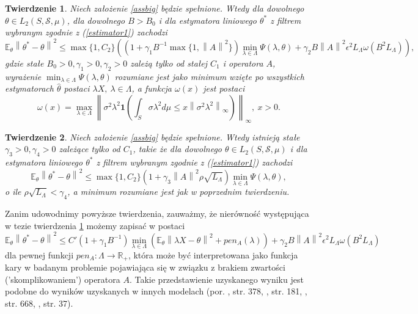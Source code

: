 \documentclass{mwart}
\newtheorem{tw}{Twierdzenie}
\newcommand{\norm}[1]{\left\lVert#1\right\rVert}
\begin{document}
\begin{tw}\label{glowny3}
Niech założenie \ref{assbig} będzie spełnione. Wtedy dla dowolnego $\theta\in L_2(S,\mathcal{S},\mu)$, dla dowolnego $B>B_0$ i dla estymatora liniowego $\theta^*$ z filtrem wybranym zgodnie z (\ref{estimator1}) zachodzi
\begin{displaymath}
\mathbb{E}_{\theta}\norm{\theta^*-\theta}^2\leq \max \{1,C_2\}\left((1+\gamma_1B^{-1}\max\{1,\norm{A}^2\})\min_{\lambda\in \Lambda}\Psi(\lambda,\theta)+\gamma_2B\norm{A}^2\epsilon^2L_{\Lambda}\omega(B^2L_{\Lambda})\right),
\end{displaymath}
gdzie stałe $B_0>0,\gamma_1>0,\gamma_2>0$ zależą tylko od stałej $C_1$ i operatora $A$, wyrażenie $\min_{\lambda\in \Lambda}\Psi(\lambda,\theta)$ rozumiane jest jako minimum wzięte po wszystkich estymatorach $\hat{\theta}$ postaci $\lambda X,\ \lambda\in \Lambda$, a funkcja $\omega(x)$ jest postaci
\begin{displaymath}
\omega(x)=\max_{\lambda\in \Lambda}\norm{\sigma^2\lambda^2\pmb{1}\left(\int_S\sigma\lambda^2d\mu\leq x \norm{\sigma^2\lambda^2}_{\infty}\right)}_{\infty},\ x>0.
\end{displaymath}
\end{tw}
\begin{tw}\label{glowny4}
Niech założenie \ref{assbig} będzie spełnione. Wtedy istnieją stałe $\gamma_3>0,\gamma_4>0$ zależące tylko od $C_1$, takie że dla dowolnego $\theta\in L_2(S,\mathcal{S},\mu)$ i dla estymatora liniowego $\theta^*$ z filtrem wybranym zgodnie z (\ref{estimator1}) zachodzi
\begin{displaymath}
\mathbb{E}_{\theta}\norm{\theta^*-\theta}^2\leq \max \{1,C_2\}(1+\gamma_3\norm{A}^2\rho\sqrt{L_{\Lambda}})\min_{\lambda\in \Lambda}\Psi(\lambda,\theta),
\end{displaymath}
o ile $\rho\sqrt{L_{\Lambda}}<\gamma_4$, a minimum rozumiane jest jak w poprzednim twierdzeniu.
\end{tw}

Zanim udowodnimy powyższe twierdzenia, zauważmy, że nierówność występująca w tezie twierdzenia \ref{glowny3} możemy zapisać w postaci
\begin{displaymath}
\mathbb{E}_{\theta}\norm{\theta^*-\theta}^2\leq C'(1+\gamma_1B^{-1})\min_{\lambda\in \Lambda}\left(\mathbb{E}_{\theta}\norm{\lambda X-\theta}^2+pen_A(\lambda)\right)+\gamma_2B\norm{A}^2\epsilon^2L_{\Lambda}\omega(B^2L_{\Lambda})
\end{displaymath}
dla pewnej funkcji $pen_A\colon \Lambda \to \mathbb{R}_+$, która może być interpretowana jako funkcja kary w badanym problemie pojawiająca się w związku z brakiem zwartości ('skomplikowaniem') operatora $A$. Takie przedstawienie uzyskanego wyniku jest podobne do wyników uzyskanych w innych modelach (por. \cite{barron}, str. 378, \cite{loubes}, str. 181, \cite{loubes}, str. 668, \cite{giraud}, str. 37).
\end{document}

